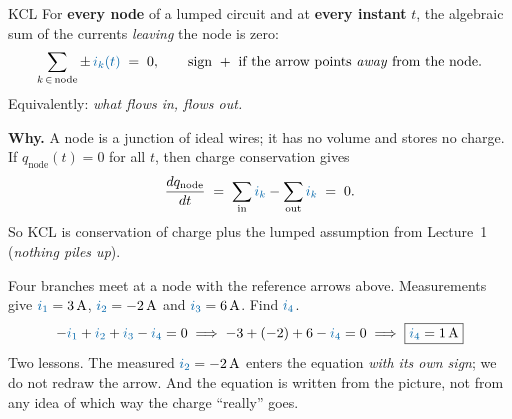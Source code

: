 \documentclass[11pt,a4paper]{article}
\newcommand{\Icol}[1]{\textcolor{ccur}{#1}}
\newcommand{\uni}[1]{\,\mathrm{#1}}
\newcommand{\A}{\uni{A}}   \newcommand{\V}{\uni{V}}
\begin{document}
\begin{definitionbox}{KCL}
For \textbf{every node} of a lumped circuit and at \textbf{every instant} $t$, the
algebraic sum of the currents \emph{leaving} the node is zero:
\[
  \sum_{k \,\in\, \text{node}} \pm\, \Icol{i_k(t)} \;=\; 0 ,
  \qquad
  \text{sign } + \text{ if the arrow points \emph{away} from the node.}
\]
Equivalently: \emph{what flows in, flows out.}
\end{definitionbox}

\textbf{Why.} A node is a junction of ideal wires; it has no volume and stores no charge.
If $q_{\text{node}}(t) = 0$ for all $t$, then charge conservation gives
\[
  \frac{dq_{\text{node}}}{dt} \;=\; \sum_{\text{in}} \Icol{i_k} - \sum_{\text{out}} \Icol{i_k} \;=\; 0 .
\]
So KCL is conservation of charge plus the lumped assumption from Lecture~1
(\emph{nothing piles up}).

\begin{center}
\end{center}

\begin{examplebox}
Four branches meet at a node with the reference arrows above. Measurements give
$\Icol{i_1} = 3\A$, $\Icol{i_2} = -2\A$ and $\Icol{i_3} = 6\A$. Find $\Icol{i_4}$.
\[
  -\Icol{i_1} + \Icol{i_2} + \Icol{i_3} - \Icol{i_4} = 0
  \;\Longrightarrow\;
  -3 + (-2) + 6 - \Icol{i_4} = 0
  \;\Longrightarrow\;
  \boxed{\Icol{i_4} = 1\A}
\]
Two lessons. The measured $\Icol{i_2} = -2\A$ enters the equation \emph{with its own sign};
we do not redraw the arrow. And the equation is written from the picture, not from any
idea of which way the charge ``really'' goes.
\end{examplebox}
\end{document}
